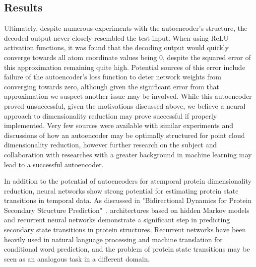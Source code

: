 \documentclass{article}
\begin{document}
	\subsection{Results}
	Ultimately, despite numerous experiments with the autoencoder's structure, the decoded output never closely resembled the test input. When using ReLU activation functions, it was found that the decoding output would quickly converge towards all atom coordinate values being 0, despite the squared error of this approximation remaining quite high. Potential sources of this error include failure of the autoencoder's loss function to deter network weights from converging towards zero, although given the significant error from that approximation we suspect another issue may be involved. While this autoencoder proved unsuccessful, given the motivations discussed above, we believe a neural approach to dimensionality reduction may prove successful if properly implemented. Very few sources were available with similar experiments and discussions of how an autoencoder may be optimally structured for point cloud dimensionality reduction, however further research on the subject and collaboration with researches with a greater background in machine learning may lead to a successful autoencoder.
	
	In addition to the potential of autoencoders for atemporal protein dimensionality reduction, neural networks show strong potential for estimating protein state transitions in temporal data. As discussed in "Bidirectional Dynamics for Protein Secondary Structure Prediction"~\cite{recurrentnetworks}, architectures based on hidden Markov models and recurrent neural networks demonstrate a significant step in predicting secondary state transitions in protein structures. Recurrent networks have been heavily used in natural language processing and machine translation for conditional word prediction, and the problem of protein state transitions may be seen as an analogous task in a different domain.
	
\end{document}

